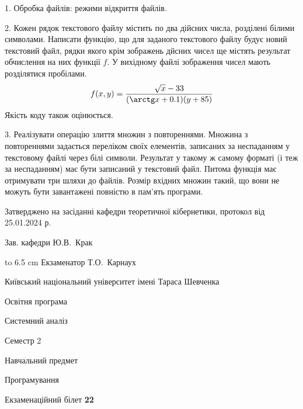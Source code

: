 \documentclass[12pt, ukrainian]{article}
\begin{document}
{%
1. Обробка файлів: режими відкриття файлів.%
\par
\vspace{2mm}

2. Кожен рядок текстового файлу містить по два дійсних числа, розділені білими символами.
Написати функцію, що для заданого текстового файлу будує новий текстовий файл, рядки якого крім зображень дйсних чисел ще містять результат обчислення на них функції $f$. У вихідному файлі зображення чисел мають розділятися пробілами. 
$$f(x, y) =\frac{\sqrt x - 33}{(\arctg x + 0.1) (y + 85)}$$ 
Якість коду також оцінюється.

\par
\vspace{2mm}

3. Реалізувати операцію злиття множин з повтореннями. Множина з повтореннями задається переліком своїх елементів, записаних за неспаданням у текстовому файлі через білі символи. Результат у такому ж самому форматі (і теж за неспаданням) має бути записаний у текстовий файл. Питома функція має отримувати три шляхи до файлів. Розмір вхідних множин такий, що вони не можуть бути завантажені повністю в пам’ять програми.

}
{\smallskip\smallskip \begin {scriptsize} Затверджено на засіданні кафедри теоретичної кібернетики, протокол   від   25.01.2024 р.\par\smallskip\smallskip\smallskip\smallskip
{\parbox {6.5 cm} {Зав. кафедри \dotfill Ю.В.~Крак}}\hspace {0.7cm} {\hbox to 6.5 cm { Екзаменатор \dotfill Т.О.~Карнаух}} \end{scriptsize}}
\vspace{0.9cm}
{{\begin {scriptsize}\par
{ \center  Київський національний університет імені Тараса Шевченка \par}
{\parbox {5 cm}{Освітня програма \hfill}{\parbox {7 cm}{Системний аналіз\hfill}}\parbox {6 cm}{\hfill Семестр 2}}\par
{\parbox {5 cm} {Навчальний предмет \hfill}\parbox {7 cm}{Програмування \hfill}\parbox {6cm}{\hfill}\par}\vspace{-15pt} \end{scriptsize}}{\center Екзаменаційний білет \No \textbf { 22 }\par}}
\end{document}
